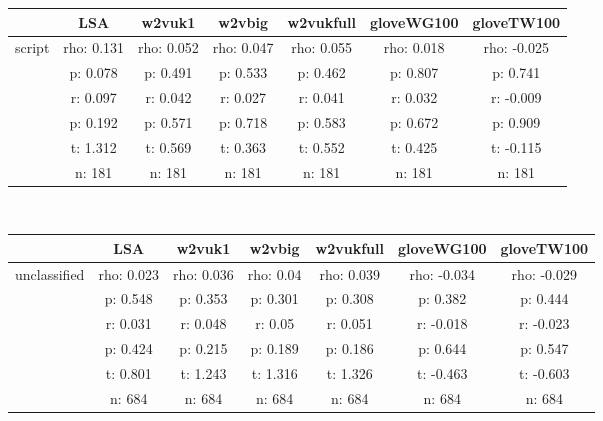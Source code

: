 \documentclass{article}
\begin{document}
\begin{tabular}{ccccccc|}\cline{2-7}
&\multicolumn{1}{|c}{LSA} & w2vuk1 & w2vbig & w2vukfull & gloveWG100 & gloveTW100 \\\hline
\multicolumn{1}{|c|}{\multirow{6}{*}{script}} & rho: 0.131 & rho: 0.052 & rho: 0.047 & rho: 0.055 & rho: 0.018 & rho: -0.025 \\
\multicolumn{1}{|c|}{} & p: 0.078 & p: 0.491 & p: 0.533 & p: 0.462 & p: 0.807 & p: 0.741 \\
\multicolumn{1}{|c|}{} & r: 0.097 & r: 0.042 & r: 0.027 & r: 0.041 & r: 0.032 & r: -0.009 \\
\multicolumn{1}{|c|}{} & p: 0.192 & p: 0.571 & p: 0.718 & p: 0.583 & p: 0.672 & p: 0.909 \\
\multicolumn{1}{|c|}{} & t: 1.312 & t: 0.569 & t: 0.363 & t: 0.552 & t: 0.425 & t: -0.115 \\
\multicolumn{1}{|c|}{} & n: 181 & n: 181 & n: 181 & n: 181 & n: 181 & n: 181 \\
\hline
\end{tabular}\\
\begin{tabular}{ccccccc|}\cline{2-7}
&\multicolumn{1}{|c}{LSA} & w2vuk1 & w2vbig & w2vukfull & gloveWG100 & gloveTW100 \\\hline
\multicolumn{1}{|c|}{\multirow{6}{*}{unclassified}} & rho: 0.023 & rho: 0.036 & rho: 0.04 & rho: 0.039 & rho: -0.034 & rho: -0.029 \\
\multicolumn{1}{|c|}{} & p: 0.548 & p: 0.353 & p: 0.301 & p: 0.308 & p: 0.382 & p: 0.444 \\
\multicolumn{1}{|c|}{} & r: 0.031 & r: 0.048 & r: 0.05 & r: 0.051 & r: -0.018 & r: -0.023 \\
\multicolumn{1}{|c|}{} & p: 0.424 & p: 0.215 & p: 0.189 & p: 0.186 & p: 0.644 & p: 0.547 \\
\multicolumn{1}{|c|}{} & t: 0.801 & t: 1.243 & t: 1.316 & t: 1.326 & t: -0.463 & t: -0.603 \\
\multicolumn{1}{|c|}{} & n: 684 & n: 684 & n: 684 & n: 684 & n: 684 & n: 684 \\
\hline
\end{tabular}\\
\end{document}
